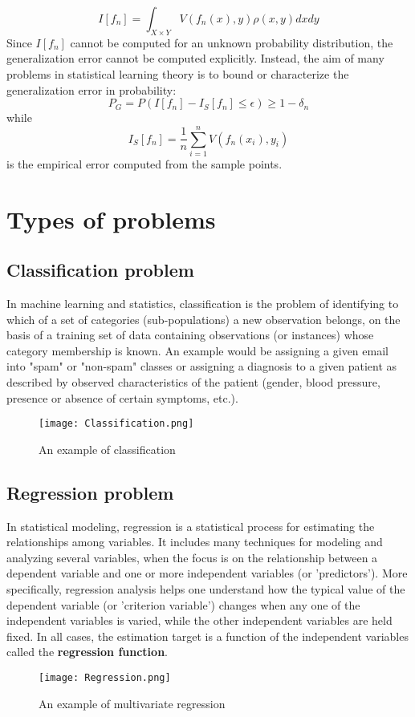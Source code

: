     \begin{equation}
        I[f_{n}]=\int _{X\times Y}V(f_{n}(x),y)\rho (x,y)dxdy
    \end{equation}
    Since $I[f_{n}]$ cannot be computed for an unknown probability distribution, the generalization error cannot be computed explicitly. Instead, the aim of many problems in statistical learning theory is to bound or characterize the generalization error in probability:
    \begin{equation}
        P_{G}=P(I[f_{n}]-I_{S}[f_{n}]\leq \epsilon )\geq 1-\delta _{n}
    \end{equation}
    while 
    \begin{equation}
        I_{S}[f_{n}]={\frac {1}{n}}\sum _{i=1}^{n}V(f_{n}(x_{i}),y_{i})
    \end{equation}
    is the empirical error computed from the sample points. 

    \section{Types of problems}
    \subsection{Classification problem}
    In machine learning and statistics, classification is the problem of identifying to which of a set of categories (sub-populations) a new observation belongs, on the basis of a training set of data containing observations (or instances) whose category membership is known. An example would be assigning a given email into "spam" or "non-spam" classes or assigning a diagnosis to a given patient as described by observed characteristics of the patient (gender, blood pressure, presence or absence of certain symptoms, etc.). 
     \begin{figure}[htbp]
         \centering
         \texttt{[image: Classification.png]}
         \caption{An example of classification}
     \end{figure}
    \subsection{Regression problem}
    In statistical modeling, regression is a statistical process for estimating the relationships among variables. It includes many techniques for modeling and analyzing several variables, when the focus is on the relationship between a dependent variable and one or more independent variables (or 'predictors'). More specifically, regression analysis helps one understand how the typical value of the dependent variable (or 'criterion variable') changes when any one of the independent variables is varied, while the other independent variables are held fixed.  In all cases, the estimation target is a function of the independent variables called the \textbf{regression function}.
    \begin{figure}[htbp]
        \centering
        \texttt{[image: Regression.png]}
        \caption{An example of multivariate regression}
    \end{figure}



